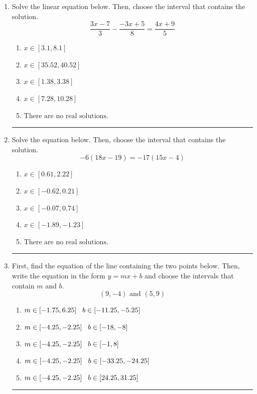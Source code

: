 \documentclass[14pt]{extbook}
\newcommand{\litem}[1]{\item#1\hspace*{-1cm}\rule{\textwidth}{0.4pt}}
\begin{document}
\begin{enumerate}
\litem{
Solve the linear equation below. Then, choose the interval that contains the solution.\[ \frac{3x -7}{3} - \frac{-3x + 5}{8} = \frac{4x + 9}{5} \]\begin{enumerate}[label=\Alph*.]
\item \( x \in [3.1, 8.1] \)
\item \( x \in [35.52, 40.52] \)
\item \( x \in [1.38, 3.38] \)
\item \( x \in [7.28, 10.28] \)
\item \( \text{There are no real solutions.} \)

\end{enumerate} }
\litem{
Solve the equation below. Then, choose the interval that contains the solution.\[ -6(18x -19) = -17(15x -4) \]\begin{enumerate}[label=\Alph*.]
\item \( x \in [0.61, 2.22] \)
\item \( x \in [-0.62, 0.21] \)
\item \( x \in [-0.07, 0.74] \)
\item \( x \in [-1.89, -1.23] \)
\item \( \text{There are no real solutions.} \)

\end{enumerate} }
\litem{
First, find the equation of the line containing the two points below. Then, write the equation in the form $ y=mx+b $ and choose the intervals that contain $m$ and $b$.\[ (9, -4) \text{ and } (5, 9) \]\begin{enumerate}[label=\Alph*.]
\item \( m \in [-1.75, 6.25] \hspace*{3mm} b \in [-11.25, -5.25] \)
\item \( m \in [-4.25, -2.25] \hspace*{3mm} b \in [-18, -8] \)
\item \( m \in [-4.25, -2.25] \hspace*{3mm} b \in [-1, 8] \)
\item \( m \in [-4.25, -2.25] \hspace*{3mm} b \in [-33.25, -24.25] \)
\item \( m \in [-4.25, -2.25] \hspace*{3mm} b \in [24.25, 31.25] \)


\end{enumerate}}
\end{enumerate}
\end{document}
